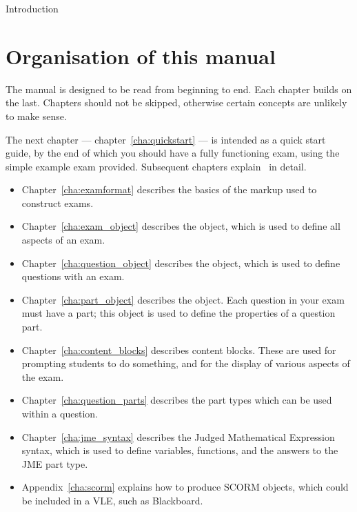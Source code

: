 \begin{chapter}{\label{cha:introduction}Introduction}
  \section{Organisation of this manual}
  The manual is designed to be read from beginning to end.  Each chapter builds
  on the last.  Chapters should not be skipped, otherwise certain concepts are
  unlikely to make sense.

  The next chapter --- chapter~\ref{cha:quickstart} --- is intended as a quick
  start guide, by the end of which you should have a fully functioning exam,
  using the simple example exam provided.  Subsequent chapters explain \numbas\
  in detail.
  \begin{itemize}
    \item Chapter~\ref{cha:examformat} describes the basics of the markup used
      to construct exams.
    \item Chapter~\ref{cha:exam_object} describes the  object,
      which is used to define all aspects of an exam.
    \item Chapter~\ref{cha:question_object} describes the 
      object, which is used to define questions with an exam.
    \item Chapter~\ref{cha:part_object} describes the  object.
      Each question in your exam must have a part; this object is used to
      define the properties of a question part.
    \item Chapter~\ref{cha:content_blocks} describes content blocks.  These are
      used for prompting students to do something, and for the display of
      various aspects of the exam.
    \item Chapter~\ref{cha:question_parts} describes the part types which can
      be used within a question.
    \item Chapter~\ref{cha:jme_syntax} describes the Judged Mathematical
      Expression syntax, which is used to define variables, functions, and the
      answers to the JME part type.
    \item Appendix~\ref{cha:scorm} explains how to produce SCORM objects, which
      could be included in a VLE, such as Blackboard.
  \end{itemize}
\end{chapter}
